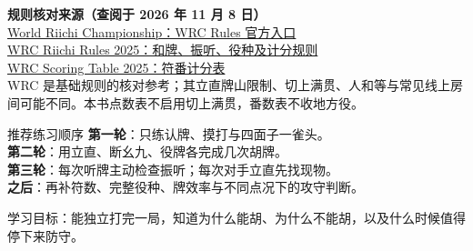 \documentclass[UTF8,a4paper,zihao=5,fontset=fandol]{ctexart}
\newcommand{\smalltext}[1]{{\small\color{muted}#1}}
\begin{document}
\textbf{规则核对来源（查阅于 2026 年 11 月 8 日）}\\
\href{https://www.worldriichi.org/wrc-rules}{World Riichi Championship：WRC Rules 官方入口}\\
\href{https://www.worldriichi.org/s/WRC-Rules-2025-42fx.pdf}{WRC Riichi Rules 2025：和牌、振听、役种及计分规则}\\
\href{https://www.worldriichi.org/s/WRC-Scoring-Table-2025.pdf}{WRC Scoring Table 2025：符番计分表}\\
\smalltext{WRC 是基础规则的核对参考；其立直牌山限制、切上满贯、人和等与常见线上房间可能不同。本书点数表不启用切上满贯，番数表不收地方役。}

\begin{note}{推荐练习顺序}
\textbf{第一轮}：只练认牌、摸打与四面子一雀头。\\
\textbf{第二轮}：用立直、断幺九、役牌各完成几次胡牌。\\
\textbf{第三轮}：每次听牌主动检查振听；每次对手立直先找现物。\\
\textbf{之后}：再补符数、完整役种、牌效率与不同点况下的攻守判断。
\end{note}
\vfill
\smalltext{学习目标：能独立打完一局，知道为什么能胡、为什么不能胡，以及什么时候值得停下来防守。}
\end{document}
